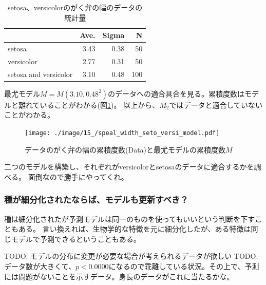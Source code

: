 \begin{table}
    \caption{setosa、versicolorのがく弁の幅のデータの統計量}
    \label{fig:seto_versi_speal_w_summary}
    \centering
    \begin{tabular}{lrrr}
        \hline
        {} &  Ave. &  Sigma &   N \\
        \hline \hline
        setosa     &  3.43 &   0.38 &  50 \\
        versicolor &  2.77 &   0.31 &  50 \\
        setosa and versicolor &  3.10 &   0.48 &  100 \\
        \hline
    \end{tabular}
\end{table}

最尤モデル$M=M(3.10,0.48^2)$のデータへの適合具合を見る。累積度数はモデルと離れていることがわかる(図\ref{fig:speal_width_setosa_versi_model})。
以上から、$M_2$ではデータと適合していないことがわかる。


\begin{figure}
    \begin{center}
        \texttt{[image: ./image/15\_/speal\_width\_seto\_versi\_model.pdf]}
        \caption{データのがく弁の幅の累積度数(Data)と最尤モデルの累積度数$M$}
        \label{fig:speal_width_setosa_versi_model}
    \end{center}
\end{figure}


二つのモデルを構築し、それぞれがversicolorとsetosaのデータに適合するかを調べる。
面倒なので勝手にやってくれ。


\subsubsection{種が細分化されたならば、モデルも更新すべき？}
種は細分化されたが予測モデルは同一のものを使ってもいいという判断を下すこともある。
言い換えれば、生物学的な特徴を元に細分化したが、ある特徴は同じモデルで予測できるということもある。


TODO: モデルの分布に変更が必要な場合が考えられるデータが欲しい
TODO: データ数が大きくて、$p<0.0000$になるので乖離している状況。その上で、予測には問題がないことを示すデータ。身長のデータがこれに当たるかな。


